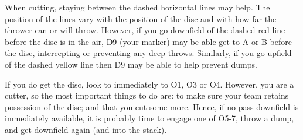 \documentclass{tufte-handout}
\begin{document}
When cutting,
staying  
between 
the dashed 
horizontal 
lines 
may help. 
The position of 
the lines vary
with the position of the disc
and with how far the thrower  
can or will 
throw. 
However, 
if you go 
downfield of the dashed red line 
before the disc is in the air,
D9 (your marker) 
may be able 
get to
A or B 
before the disc,
intercepting 
or preventing 
any deep throws. 
Similarly, 
if you go 
upfield of the dashed yellow line
then D9 may 
be able to help
prevent dumps.

If you do get the disc,
look to immediately  
to O1, 
O3 
or O4. 
However, 
you are a cutter, 
so the most 
important things to do are:
to make sure your team 
retains possession of the disc; and
that you cut some more. 
Hence, 
if no pass downfield 
is immediately available, 
it is probably time to engage 
one of O5-7, 
throw a dump, 
and get downfield again 
(and into the stack).
\end{document}
